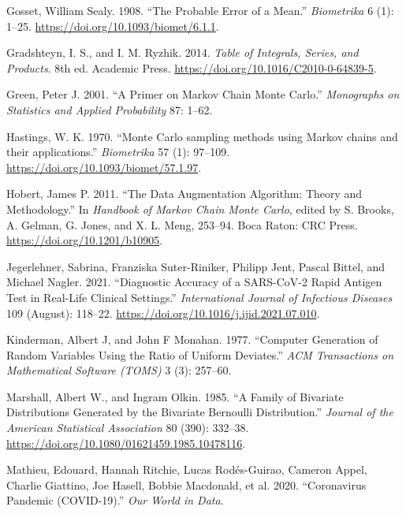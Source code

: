 \documentclass[
  11pt,
  letterpaper,
]{scrbook}
\newlength{\cslhangindent}
\newenvironment{CSLReferences}[2] %
 {\begin{list}{}{%
  \setlength{\itemindent}{0pt}
  \setlength{\leftmargin}{0pt}
  \setlength{\parsep}{0pt}
  \ifodd #1
   \setlength{\leftmargin}{\cslhangindent}
   \setlength{\itemindent}{-1\cslhangindent}
  \fi
  \setlength{\itemsep}{#2\baselineskip}}}
 {\end{list}}
\theoremstyle{definition}
\theoremstyle{plain}
\theoremstyle{plain}
\theoremstyle{definition}
\theoremstyle{definition}
\theoremstyle{remark}
\begin{document}
\begin{CSLReferences}{1}{0}
Gosset, William Sealy. 1908. {``The Probable Error of a Mean.''}
\emph{Biometrika} 6 (1): 1--25.
\url{https://doi.org/10.1093/biomet/6.1.1}.

Gradshteyn, I. S., and I. M. Ryzhik. 2014. \emph{Table of Integrals,
Series, and Products}. 8th ed. Academic Press.
\url{https://doi.org/10.1016/C2010-0-64839-5}.

Green, Peter J. 2001. {``A Primer on {M}arkov Chain {M}onte {C}arlo.''}
\emph{Monographs on Statistics and Applied Probability} 87: 1--62.

Hastings, W. K. 1970. {``{Monte {C}arlo sampling methods using {M}arkov
chains and their applications}.''} \emph{Biometrika} 57 (1): 97--109.
\url{https://doi.org/10.1093/biomet/57.1.97}.

Hobert, James P. 2011. {``The Data Augmentation Algorithm: Theory and
Methodology.''} In \emph{Handbook of {M}arkov Chain {M}onte {C}arlo},
edited by S. Brooks, A. Gelman, G. Jones, and X. L. Meng, 253--94. Boca
Raton: CRC Press. \url{https://doi.org/10.1201/b10905}.

Jegerlehner, Sabrina, Franziska Suter-Riniker, Philipp Jent, Pascal
Bittel, and Michael Nagler. 2021. {``Diagnostic Accuracy of a
{SARS-CoV-2} Rapid Antigen Test in Real-Life Clinical Settings.''}
\emph{International Journal of Infectious Diseases} 109 (August):
118--22. \url{https://doi.org/10.1016/j.ijid.2021.07.010}.

Kinderman, Albert J, and John F Monahan. 1977. {``Computer Generation of
Random Variables Using the Ratio of Uniform Deviates.''} \emph{ACM
Transactions on Mathematical Software (TOMS)} 3 (3): 257--60.

Marshall, Albert W., and Ingram Olkin. 1985. {``A Family of Bivariate
Distributions Generated by the Bivariate {B}ernoulli Distribution.''}
\emph{Journal of the American Statistical Association} 80 (390):
332--38. \url{https://doi.org/10.1080/01621459.1985.10478116}.

Mathieu, Edouard, Hannah Ritchie, Lucas Rodés-Guirao, Cameron Appel,
Charlie Giattino, Joe Hasell, Bobbie Macdonald, et al. 2020.
{``Coronavirus Pandemic (COVID-19).''} \emph{Our World in Data}.


\end{CSLReferences}
\end{document}
